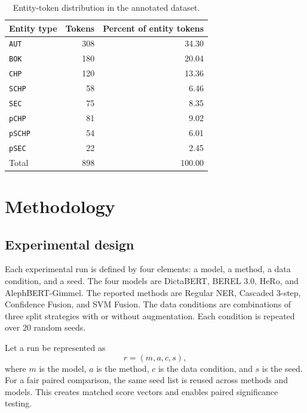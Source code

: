 \documentclass[12pt,a4paper]{report}
\begin{document}
\begin{table}[htbp]
\centering
\small
\caption{Entity-token distribution in the annotated dataset.}
\label{tab:entity_distribution}
\begin{tabular}{lrr}
\toprule
Entity type & Tokens & Percent of entity tokens \\
\midrule
\texttt{AUT} & 308 & 34.30 \\
\texttt{BOK} & 180 & 20.04 \\
\texttt{CHP} & 120 & 13.36 \\
\texttt{SCHP} & 58 & 6.46 \\
\texttt{SEC} & 75 & 8.35 \\
\texttt{pCHP} & 81 & 9.02 \\
\texttt{pSCHP} & 54 & 6.01 \\
\texttt{pSEC} & 22 & 2.45 \\
\midrule
Total & 898 & 100.00 \\
\bottomrule
\end{tabular}
\end{table}

\chapter{Methodology}
\section{Experimental design}
Each experimental run is defined by four elements: a model, a method, a data condition, and a seed. The four models are DictaBERT, BEREL 3.0, HeRo, and AlephBERT-Gimmel. The reported methods are Regular NER, Cascaded 3-step, Confidence Fusion, and SVM Fusion. The data conditions are combinations of three split strategies with or without augmentation. Each condition is repeated over 20 random seeds.

Let a run be represented as
\[
  r=(m,a,c,s),
\]
where $m$ is the model, $a$ is the method, $c$ is the data condition, and $s$ is the seed. For a fair paired comparison, the same seed list is reused across methods and models. This creates matched score vectors and enables paired significance testing.
\end{document}
